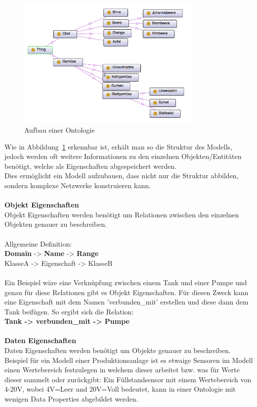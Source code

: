 \begin{figure}[hbt!]
  \centering
  \includegraphics[width=0.8\textwidth]{graphics/stateoftheart/Ontology_example}
  \caption{Aufbau einer Ontologie}
  \label{fig:Ontology_Aufbau}
\end{figure}

Wie in Abbildung~\ref{fig:Ontology_Aufbau} erkennbar ist, erhält man so die Struktur des Modells, jedoch werden oft weitere Informationen zu den einzelnen Objekten/Entitäten benötigt, welche als Eigenschaften abgespeichert werden.\\
Dies ermöglicht ein Modell aufzubauen, dass nicht nur die Struktur abbilden, sondern komplexe Netzwerke konstruieren kann.\\
\\
\noindent \textbf{Objekt Eigenschaften}\\
Objekt Eigenschaften werden benötigt um Relationen zwischen den einzelnen Objekten genauer zu beschreiben.\\
\\
Allgemeine Definition:\\
\textbf{Domain} -> \textbf{Name} -> \textbf{Range}\\
KlasseA -> Eigenschaft -> KlasseB\\
\\
Ein Beispiel wäre eine Verknüpfung zwischen einem Tank und einer Pumpe und genau für diese Relationen gibt es Objekt Eigenschaften. Für diesen Zweck kann eine Eigenschaft mit dem Namen 'verbunden\_mit' erstellen und diese dann dem Tank beifügen. So ergibt sich die Relation:\\
\textbf{Tank -> verbunden\_mit -> Pumpe}
\\
\\
\textbf{Daten Eigenschaften}\\
Daten Eigenschaften werden benötigt um Objekte genauer zu beschreiben. 
\\
Beispiel für ein Modell einer Produktionsanlage ist es etwaige Sensoren im Modell einen Wertebereich festzulegen in welchem dieser arbeitet bzw. was für Werte dieser sammelt oder zurückgibt: Ein Füllstandsensor mit einem Wertebereich von 4-20V, wobei 4V=Leer und 20V=Voll bedeutet, kann in einer Ontologie mit wenigen Data Properties abgebildet werden.

